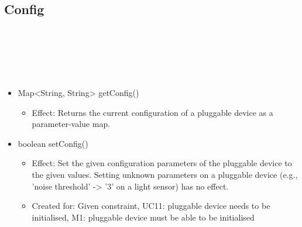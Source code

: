   \subsection{Config}\label{int:PuggableDevicePluggableDeviceFacadeConfig}
    \begin{description}
      \item[Provided by:] \iconcomponent{}~
      \item[Required by:] \iconcomponent{}~
      \item[Operations:] ~
    \begin{itemize}[noitemsep,nolistsep,leftmargin=-.25cm]
      \item \textsf{Map\textless{}String, String\textgreater{} getConfig()}
        \begin{itemize}[noitemsep,nolistsep]
           \item Effect: Returns the current configuration of a pluggable device as a parameter-value map.
        \end{itemize}
      \item \textsf{boolean setConfig()}
        \begin{itemize}[noitemsep,nolistsep]
           \item Effect: Set the given configuration parameters of the pluggable device to the given values. Setting unknown parameters on a pluggable device (e.g., 'noise threshold' -> '3' on a light sensor) has no effect.
\item Created for: Given constraint, UC11: pluggable device needs to be initialised, M1: pluggable device must be able to be initialised
        \end{itemize}
    \end{itemize}
    \end{description}

